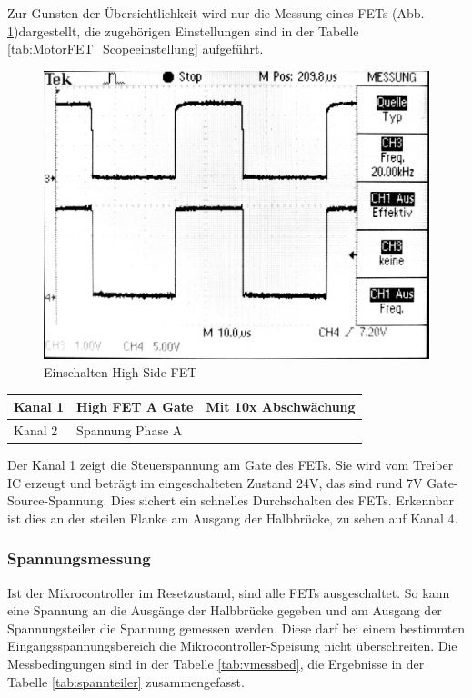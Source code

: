 Zur Gunsten der Übersichtlichkeit wird nur die Messung eines FETs (Abb. \ref{fig:hsfet})dargestellt, die zugehörigen Einstellungen sind in der Tabelle \ref{tab:MotorFET_Scopeeinstellung} aufgeführt.

\begin{figure} [H]
	\centering
	\includegraphics[width=0.6\linewidth]{images/valmcfet.jpg}
	\caption{Einschalten High-Side-FET}
	\label{fig:hsfet}
\end{figure}

\begin{center}
	\begin{tabular}{l|l|l}
		\hline 
		Kanal 1 & High FET A Gate & Mit 10x Abschwächung\\ \hline
		Kanal 2 & Spannung Phase A & {}\\ \hline
	\end{tabular}
	\label{tab:MotorFET_Scopeeinstellung}
\end{center}

Der Kanal 1 zeigt die Steuerspannung am Gate des FETs. Sie wird vom Treiber IC erzeugt und beträgt im eingeschalteten Zustand 24V, das sind rund 7V Gate-Source-Spannung. Dies sichert ein schnelles Durchschalten des FETs. Erkennbar ist dies an der steilen Flanke am Ausgang der Halbbrücke, zu sehen auf Kanal 4.

\subsubsection*{Spannungsmessung}
Ist der Mikrocontroller im Resetzustand, sind alle FETs ausgeschaltet. So kann eine Spannung an die Ausgänge der Halbbrücke gegeben und am Ausgang der Spannungsteiler die Spannung gemessen werden. Diese darf bei einem bestimmten Eingangsspannungsbereich die Mikrocontroller-Speisung nicht überschreiten. Die Messbedingungen sind in der Tabelle \ref{tab:vmessbed}, die Ergebnisse in der Tabelle \ref{tab:spannteiler} zusammengefasst.

